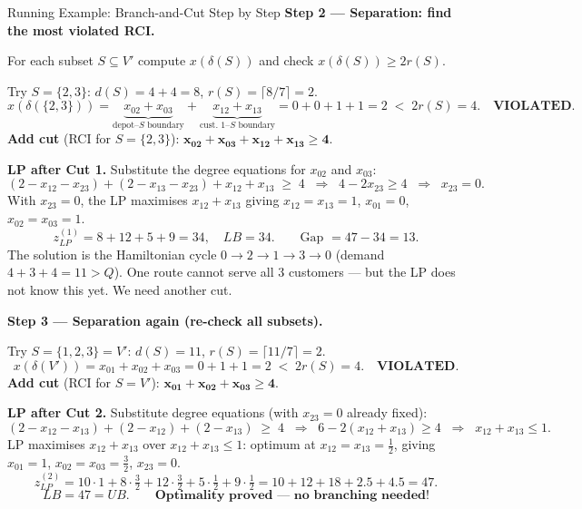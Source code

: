 \documentclass[aspectratio=169,10pt]{beamer}
\begin{document}
\begin{frame}[allowframebreaks]{Running Example: Branch-and-Cut Step by Step}
  \textbf{Step 2 — Separation: find the most violated RCI.}

  \smallskip
  For each subset $S\subseteq V'$ compute $x(\delta(S))$ and check $x(\delta(S))\geq 2r(S)$.

  Try $S=\{2,3\}$:\; $d(S)=4+4=8$,\; $r(S)=\lceil 8/7\rceil=2$.
  \[
    x\!\left(\delta(\{2,3\})\right)
      = \underbrace{x_{02}+x_{03}}_{\text{depot--}S\text{ boundary}}
      + \underbrace{x_{12}+x_{13}}_{\text{cust.~1--}S\text{ boundary}}
      = 0+0+1+1 = 2 \;<\; 2r(S)=4.
    \quad\textbf{VIOLATED.}
  \]
  \textbf{Add cut} (RCI for $S=\{2,3\}$):
  $\boldsymbol{x_{02}+x_{03}+x_{12}+x_{13}\geq 4}$.

  \medskip
  \textbf{LP after Cut 1.}\;
  Substitute the degree equations for $x_{02}$ and $x_{03}$:
  \[
    (2-x_{12}-x_{23})+(2-x_{13}-x_{23})+x_{12}+x_{13}\;\geq\;4
    \;\;\Longrightarrow\;\;
    4-2x_{23}\geq 4
    \;\;\Longrightarrow\;\;
    x_{23}=0.
  \]
  With $x_{23}=0$, the LP maximises $x_{12}+x_{13}$ giving $x_{12}=x_{13}=1$,
  $x_{01}=0$, $x_{02}=x_{03}=1$.
  \[
    \boxed{z_{LP}^{(1)} = 8+12+5+9 = 34,\quad LB=34.}
    \qquad\text{Gap }=47-34=13.
  \]
  The solution is the Hamiltonian cycle $0\!\to\!2\!\to\!1\!\to\!3\!\to\!0$
  (demand $4+3+4=11>Q$).  One route cannot serve all 3 customers ---
  but the LP does not know this yet.  We need another cut.

  \framebreak

  \textbf{Step 3 — Separation again (re-check all subsets).}

  \smallskip
  Try $S=\{1,2,3\}=V'$:\; $d(S)=11$,\; $r(S)=\lceil 11/7\rceil=2$.
  \[
    x\!\left(\delta(V')\right) = x_{01}+x_{02}+x_{03} = 0+1+1 = 2 \;<\; 2r(S)=4.
    \quad\textbf{VIOLATED.}
  \]
  \textbf{Add cut} (RCI for $S=V'$):
  $\boldsymbol{x_{01}+x_{02}+x_{03}\geq 4}$.

  \medskip
  \textbf{LP after Cut 2.}\;
  Substitute degree equations (with $x_{23}=0$ already fixed):
  \[
    (2-x_{12}-x_{13})+(2-x_{12})+(2-x_{13})\;\geq\;4
    \;\;\Longrightarrow\;\;
    6-2(x_{12}+x_{13})\geq 4
    \;\;\Longrightarrow\;\;
    x_{12}+x_{13}\leq 1.
  \]
  LP maximises $x_{12}+x_{13}$ over $x_{12}+x_{13}\leq 1$: optimum at
  $x_{12}=x_{13}=\tfrac{1}{2}$, giving
  $x_{01}=1$, $x_{02}=x_{03}=\tfrac{3}{2}$, $x_{23}=0$.
  \[
    z_{LP}^{(2)} = 10\cdot1 + 8\cdot\tfrac{3}{2} + 12\cdot\tfrac{3}{2}
                 + 5\cdot\tfrac{1}{2} + 9\cdot\tfrac{1}{2}
                 = 10+12+18+2.5+4.5 = 47.
  \]
  \[
    \boxed{LB = 47 = UB.}
    \qquad \textbf{Optimality proved --- no branching needed!}
  \]


\end{frame}
\end{document}
